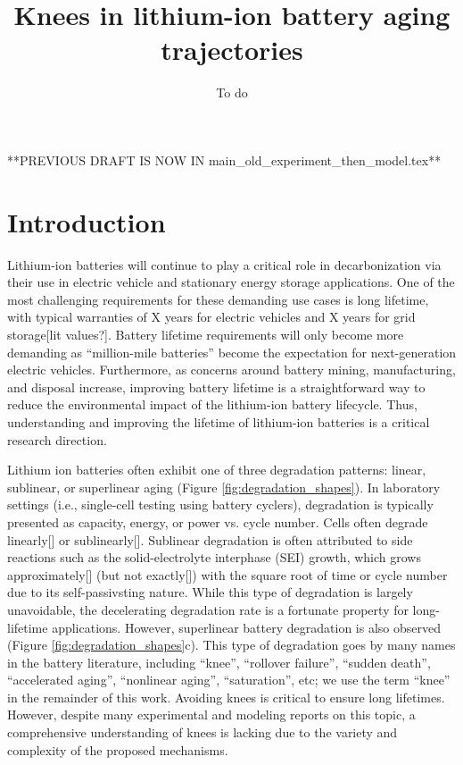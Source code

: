 \documentclass{article}
\title{Knees in lithium-ion battery aging trajectories}
\author{To do}
\date{}
\begin{document}
\maketitle

**PREVIOUS DRAFT IS NOW IN main\_old\_experiment\_then\_model.tex**

\section{Introduction}

Lithium-ion batteries will continue to play a critical role in decarbonization via their use in electric vehicle and stationary energy storage applications. One of the most challenging requirements for these demanding use cases is long lifetime, with typical warranties of X years for electric vehicles and X years for grid storage[lit values?]. Battery lifetime requirements will only become more demanding as “million-mile batteries” become the expectation for next-generation electric vehicles. Furthermore, as concerns around battery mining, manufacturing, and disposal increase, improving battery lifetime is a straightforward way to reduce the environmental impact of the lithium-ion battery lifecycle. Thus, understanding and improving the lifetime of lithium-ion batteries is a critical research direction.

Lithium ion batteries often exhibit one of three degradation patterns: linear, sublinear, or superlinear aging (Figure \ref{fig:degradation_shapes}). In laboratory settings (i.e., single-cell testing using battery cyclers), degradation is typically presented as capacity, energy, or power vs. cycle number. Cells often degrade linearly[] or sublinearly[]. Sublinear degradation is often attributed to side reactions such as the solid-electrolyte interphase (SEI) growth, which grows approximately[] (but not exactly[]) with the square root of time or cycle number due to its self-passivsting nature. While this type of degradation is largely unavoidable, the decelerating degradation rate is a fortunate property for long-lifetime applications. However, superlinear battery degradation is also observed (Figure \ref{fig:degradation_shapes}c). This type of degradation goes by many names in the battery literature, including ``knee'', ``rollover failure'', ``sudden death'', ``accelerated aging'', ``nonlinear aging'', ``saturation'', etc; we use the term ``knee'' in the remainder of this work. Avoiding knees is critical to ensure long lifetimes. However, despite many experimental and modeling reports on this topic, a comprehensive understanding of knees is lacking due to the variety and complexity of the proposed mechanisms.
\end{document}
